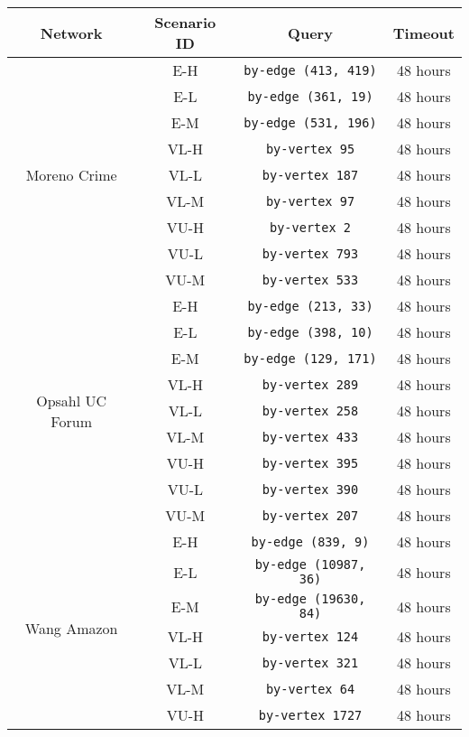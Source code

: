 \begin{table}[H]
\centering
\begin{tabular}{|c|c|c|c|}
  \hline
  \textbf{Network} & \textbf{Scenario ID} & \textbf{Query} & \textbf{Timeout}\\
  \hline
  \multirow{9}{*}{Moreno Crime} & E-H & \texttt{by-edge (413, 419)} & 48 hours \\
  & E-L & \texttt{by-edge (361, 19)} & 48 hours \\
  & E-M & \texttt{by-edge (531, 196)} & 48 hours \\
  & VL-H & \texttt{by-vertex 95} & 48 hours \\
  & VL-L & \texttt{by-vertex 187} & 48 hours \\
  & VL-M & \texttt{by-vertex 97} & 48 hours \\
  & VU-H & \texttt{by-vertex 2} & 48 hours \\
  & VU-L & \texttt{by-vertex 793} & 48 hours \\
  & VU-M & \texttt{by-vertex 533} & 48 hours \\
  \hline
  \multirow{9}{*}{Opsahl UC Forum} & E-H & \texttt{by-edge (213, 33)} & 48 hours \\
  & E-L & \texttt{by-edge (398, 10)} & 48 hours \\
  & E-M & \texttt{by-edge (129, 171)} & 48 hours \\
  & VL-H & \texttt{by-vertex 289} & 48 hours \\
  & VL-L & \texttt{by-vertex 258} & 48 hours \\
  & VL-M & \texttt{by-vertex 433} & 48 hours \\
  & VU-H & \texttt{by-vertex 395} & 48 hours \\
  & VU-L & \texttt{by-vertex 390} & 48 hours \\
  & VU-M & \texttt{by-vertex 207} & 48 hours \\
  \hline
  \multirow{9}{*}{Wang Amazon} & E-H & \texttt{by-edge (839, 9)} & 48 hours \\
  & E-L & \texttt{by-edge (10987, 36)} & 48 hours \\
  & E-M & \texttt{by-edge (19630, 84)} & 48 hours \\
  & VL-H & \texttt{by-vertex 124} & 48 hours \\
  & VL-L & \texttt{by-vertex 321} & 48 hours \\
  & VL-M & \texttt{by-vertex 64} & 48 hours \\
  & VU-H & \texttt{by-vertex 1727} & 48 hours \\

\end{tabular}
\end{table}
